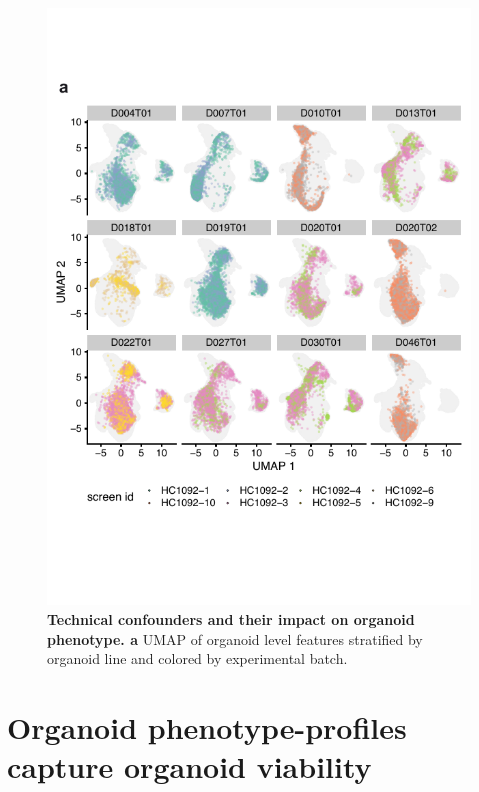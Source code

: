 \begin{flushleft}
\begin{figure}[h]
\centering
\includegraphics[width=\textwidth,
                height=\textheight,
                keepaspectratio]{figures/promise/pdf/fig_1_6.pdf}
\caption{\textbf{Technical confounders and their impact on organoid phenotype. a} UMAP of organoid level features stratified by organoid line and colored by experimental batch.}
\label{fig_216}
\end{figure}
\clearpage


\section{Organoid phenotype-profiles capture organoid viability}


\end{flushleft}
